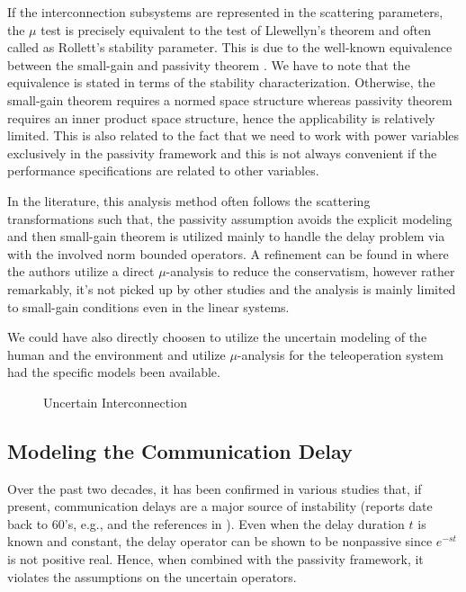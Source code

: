 If the interconnection subsystems are represented in the scattering parameters, the $\mu$ test is precisely equivalent to the test of
Llewellyn's theorem and often called as Rollett's stability parameter. This is due to the well-known equivalence between the small-gain 
and passivity theorem \cite{desvid}. We have to note that the equivalence is stated in terms of the stability characterization. Otherwise, 
the small-gain theorem requires a normed space structure whereas passivity theorem requires an inner product space structure, hence the 
applicability is relatively limited. This is also related to the fact that we need to work with power variables exclusively in the 
passivity framework and this is not always convenient if the performance specifications are related to other variables.

In the literature, this analysis method often follows the scattering transformations such that, the passivity assumption avoids the
explicit modeling and then small-gain theorem is utilized mainly to handle the delay problem via with the involved norm bounded operators.
A refinement can be found  in \cite{poortenyokokohji} where the authors utilize a direct $\mu$-analysis to reduce the conservatism, 
however rather remarkably, it's not picked up by other studies and the analysis is mainly limited to small-gain conditions even in 
the linear systems. 


We could have also directly choosen to utilize the uncertain modeling of the human and the environment and utilize $\mu$-analysis for the 
teleoperation system had the specific models been available.  


\begin{figure}%
\centering%
\caption{Uncertain Interconnection}%
\label{fig:lit:uncincgeneral}%
\end{figure}



\subsection{Modeling the Communication Delay}

Over the past two decades, it has been confirmed in various studies that, if present, communication delays are a major 
source of instability (reports date back to 60's, e.g., \cite{sheridanferrell} and the references in \cite{andersonspong}).
Even when the delay duration $t$ is known and constant, the delay operator can be shown to be nonpassive since $e^{-st}$ is 
not positive real. Hence, when combined with the passivity framework, it violates the assumptions on the uncertain operators. 


